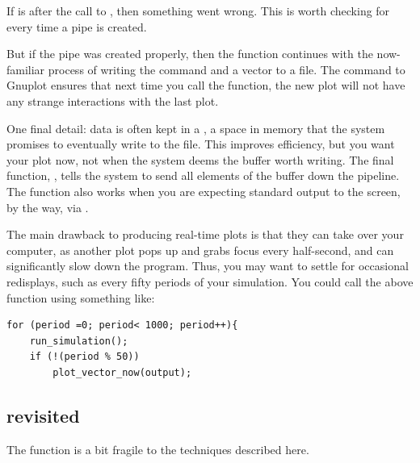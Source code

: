 If  is  after the call to , then something
went wrong.  This is worth checking for every time a pipe is created.

But if the pipe was created
properly, then the function continues with the now-familiar process of
writing the command  and a vector to a file. The 
command to Gnuplot ensures that next time you call the function, the new
plot will not have any strange interactions with the last plot.

One final detail: data is often kept in a , a space in
memory that the system promises to eventually write to the file. This
improves efficiency, but you want your plot now, not when the system
deems the buffer worth writing.  The final
function, , tells the system to send all elements of the
 buffer down the pipeline. The function also works when you are
expecting standard
output to the screen, by the way, via .

The main drawback to producing real-time plots is that they can take over
your computer, as another plot pops up and grabs focus every half-second, and can significantly slow down the program.
Thus, you may want to settle for occasional redisplays, such as every
fifty periods of your simulation. You could call the above
function using something like:

\begin{lstlisting}
for (period =0; period< 1000; period++){
    run_simulation();
    if (!(period % 50))
        plot_vector_now(output);
\end{lstlisting}


\subsection{\treesymbol{}  revisited}\label{replottwo}
The  function is a bit fragile to the techniques described
here.

